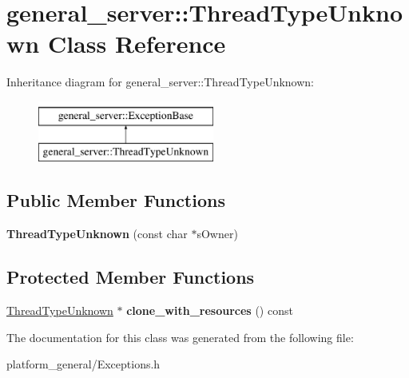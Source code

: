 \hypertarget{classgeneral__server_1_1ThreadTypeUnknown}{\section{general\-\_\-server\-:\-:\-Thread\-Type\-Unknown \-Class \-Reference}
\label{classgeneral__server_1_1ThreadTypeUnknown}
}
\-Inheritance diagram for general\-\_\-server\-:\-:\-Thread\-Type\-Unknown\-:\begin{figure}[H]
\begin{center}
\leavevmode
\includegraphics[height=2.000000cm]{classgeneral__server_1_1ThreadTypeUnknown}
\end{center}
\end{figure}
\subsection*{\-Public \-Member \-Functions}
\begin{DoxyCompactItemize}
\item 
\hypertarget{classgeneral__server_1_1ThreadTypeUnknown_ab32db764a0ee26b94970ba265966c117}{{\bfseries \-Thread\-Type\-Unknown} (const char $\ast$s\-Owner)}\label{classgeneral__server_1_1ThreadTypeUnknown_ab32db764a0ee26b94970ba265966c117}

\end{DoxyCompactItemize}
\subsection*{\-Protected \-Member \-Functions}
\begin{DoxyCompactItemize}
\item 
\hypertarget{classgeneral__server_1_1ThreadTypeUnknown_a28368b0514c8e3ee21acc3a22a10ed50}{\hyperlink{classgeneral__server_1_1ThreadTypeUnknown}{\-Thread\-Type\-Unknown} $\ast$ {\bfseries clone\-\_\-with\-\_\-resources} () const }\label{classgeneral__server_1_1ThreadTypeUnknown_a28368b0514c8e3ee21acc3a22a10ed50}

\end{DoxyCompactItemize}


\-The documentation for this class was generated from the following file\-:\begin{DoxyCompactItemize}
\item 
platform\-\_\-general/\-Exceptions.\-h\end{DoxyCompactItemize}
